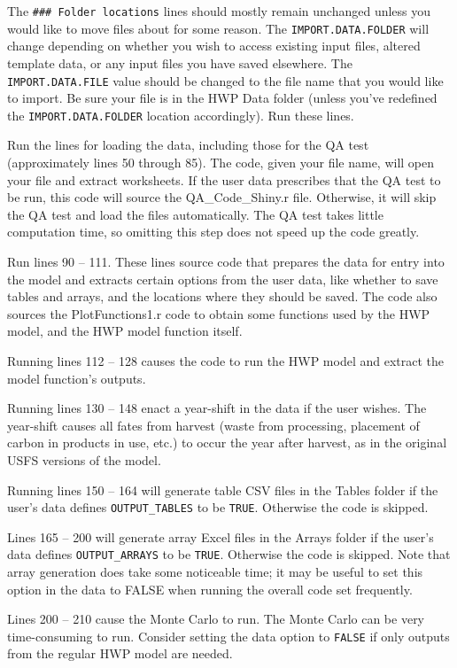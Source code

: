 \documentclass[
  openany]{book}
\begin{document}
The \texttt{\#\#\#\ Folder\ locations} lines should mostly remain unchanged unless you would like to move files about for some reason. The \texttt{IMPORT.DATA.FOLDER} will change depending on whether you wish to access existing input files, altered template data, or any input files you have saved elsewhere. The \texttt{IMPORT.DATA.FILE} value should be changed to the file name that you would like to import. Be sure your file is in the HWP Data folder (unless you've redefined the \texttt{IMPORT.DATA.FOLDER} location accordingly). Run these lines.

Run the lines for loading the data, including those for the QA test (approximately lines 50 through 85). The code, given your file name, will open your file and extract worksheets. If the user data prescribes that the QA test to be run, this code will source the QA\_Code\_Shiny.r file. Otherwise, it will skip the QA test and load the files automatically. The QA test takes little computation time, so omitting this step does not speed up the code greatly.

Run lines 90 -- 111. These lines source code that prepares the data for entry into the model and extracts certain options from the user data, like whether to save tables and arrays, and the locations where they should be saved. The code also sources the PlotFunctions1.r code to obtain some functions used by the HWP model, and the HWP model function itself.

Running lines 112 -- 128 causes the code to run the HWP model and extract the model function's outputs.

Running lines 130 -- 148 enact a year-shift in the data if the user wishes. The year-shift causes all fates from harvest (waste from processing, placement of carbon in products in use, etc.) to occur the year after harvest, as in the original USFS versions of the model.

Running lines 150 -- 164 will generate table CSV files in the Tables folder if the user's data defines \texttt{OUTPUT\_TABLES} to be \texttt{TRUE}. Otherwise the code is skipped.

Lines 165 -- 200 will generate array Excel files in the Arrays folder if the user's data defines \texttt{OUTPUT\_ARRAYS} to be \texttt{TRUE}. Otherwise the code is skipped. Note that array generation does take some noticeable time; it may be useful to set this option in the data to FALSE when running the overall code set frequently.

Lines 200 -- 210 cause the Monte Carlo to run. The Monte Carlo can be very time-consuming to run. Consider setting the data option to \texttt{FALSE} if only outputs from the regular HWP model are needed.
\end{document}

